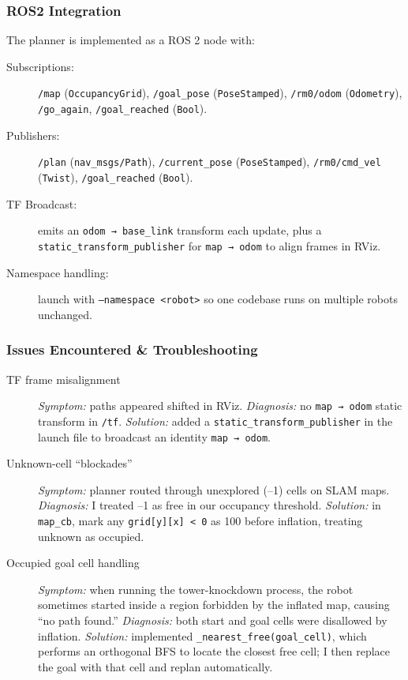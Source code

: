 \subsubsection{ROS2 Integration}
The planner is implemented as a ROS 2 node with:
\begin{description}
  \item[Subscriptions:] 
    \texttt{/map} (\texttt{OccupancyGrid}), 
    \texttt{/goal\_pose} (\texttt{PoseStamped}), 
    \texttt{/rm0/odom} (\texttt{Odometry}), 
    \texttt{/go\_again}, \texttt{/goal\_reached} (\texttt{Bool}).
  \item[Publishers:] 
    \texttt{/plan} (\texttt{nav\_msgs/Path}), 
    \texttt{/current\_pose} (\texttt{PoseStamped}), 
    \texttt{/rm0/cmd\_vel} (\texttt{Twist}), 
    \texttt{/goal\_reached} (\texttt{Bool}).
  \item[TF Broadcast:] emits an \texttt{odom → base\_link} transform each update, plus a \texttt{static\_transform\_publisher} for \texttt{map → odom} to align frames in RViz.
  \item[Namespace handling:] launch with \texttt{--namespace <robot>} so one codebase runs on multiple robots unchanged.
\end{description}

\subsubsection{Issues Encountered \& Troubleshooting}
\begin{description}
  \item[TF frame misalignment] 
    \textit{Symptom:} paths appeared shifted in RViz.  
    \textit{Diagnosis:} no \texttt{map → odom} static transform in \texttt{/tf}.  
    \textit{Solution:} added a \texttt{static\_transform\_publisher} in the launch file to broadcast an identity \texttt{map → odom}.
  \item[Unknown-cell “blockades”] 
    \textit{Symptom:} planner routed through unexplored (–1) cells on SLAM maps.  
    \textit{Diagnosis:} I treated –1 as free in our occupancy threshold.  
    \textit{Solution:} in \texttt{map\_cb}, mark any \texttt{grid[y][x] < 0} as 100 before inflation, treating unknown as occupied.
  \item[Occupied goal cell handling] 
    \textit{Symptom:} when running the tower-knockdown process, the robot sometimes started inside a region forbidden by the inflated map, causing “no path found.”  
    \textit{Diagnosis:} both start and goal cells were disallowed by inflation.  
    \textit{Solution:} implemented \texttt{\_nearest\_free(goal\_cell)}, which performs an orthogonal BFS to locate the closest free cell; I then replace the goal with that cell and replan automatically.
\end{description}
